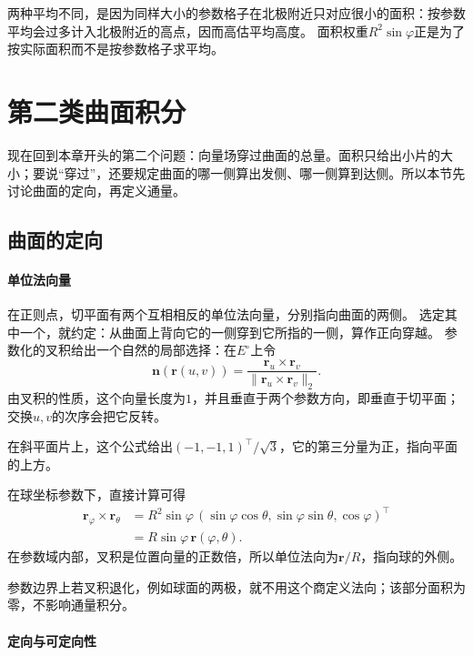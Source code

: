 两种平均不同，是因为同样大小的参数格子在北极附近只对应很小的面积：按参数平均会过多计入北极附近的高点，因而高估平均高度。
面积权重$R^2\sin\varphi$正是为了按实际面积而不是按参数格子求平均。

\section{第二类曲面积分}

现在回到本章开头的第二个问题：向量场穿过曲面的总量。面积只给出小片的大小；要说“穿过”，还要规定曲面的哪一侧算出发侧、哪一侧算到达侧。所以本节先讨论曲面的定向，再定义通量。

\subsection{曲面的定向}

\paragraph{单位法向量}

在正则点，切平面有两个互相相反的单位法向量，分别指向曲面的两侧。
选定其中一个，就约定：从曲面上背向它的一侧穿到它所指的一侧，算作正向穿越。
参数化的叉积给出一个自然的局部选择：在$E^\circ$上令
\begin{equation}
 \bm n(\bm r(u,v))
 =\frac{\bm r_u\times\bm r_v}{\lVert\bm r_u\times\bm r_v\rVert_2}.
 \label{eq:analysis-surface-unit-normal}
\end{equation}
由叉积的性质，这个向量长度为$1$，并且垂直于两个参数方向，即垂直于切平面；交换$u,v$的次序会把它反转。

在斜平面片上，这个公式给出$(-1,-1,1)^\top/\sqrt3$，它的第三分量为正，指向平面的上方。

在球坐标参数下，直接计算可得
\[
 \begin{aligned}
 \bm r_\varphi\times\bm r_\theta
 &=R^2\sin\varphi\,(\sin\varphi\cos\theta,\sin\varphi\sin\theta,\cos\varphi)^\top\\
 &=R\sin\varphi\,\bm r(\varphi,\theta).
 \end{aligned}
\]
在参数域内部，叉积是位置向量的正数倍，所以单位法向为$\bm r/R$，指向球的外侧。

参数边界上若叉积退化，例如球面的两极，就不用这个商定义法向；该部分面积为零，不影响通量积分。

\paragraph{定向与可定向性}

